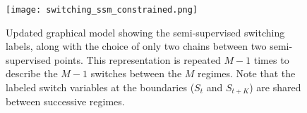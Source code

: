 \begin{figure}
  \centering
  \texttt{[image: switching\_ssm\_constrained.png]}
  \caption{Updated graphical model showing the semi-supervised switching labels, along with the choice of only two chains between two semi-supervised points. This representation is repeated $M-1$ times to describe the $M-1$ switches between the $M$ regimes. Note that the labeled switch variables at the boundaries ($S_t$ and $S_{t+K}$) are shared between successive regimes.}
  \label{fig:updated_ssm_graphical_model}
\end{figure}
